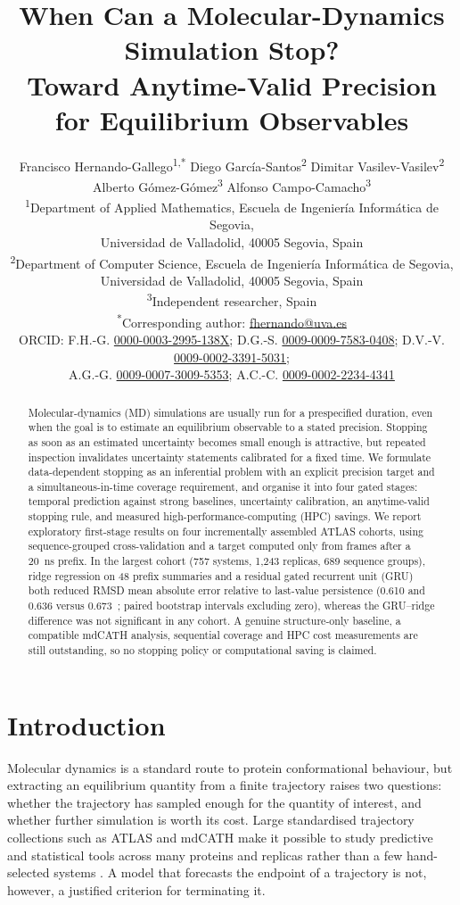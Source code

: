 \documentclass[11pt]{article}
\title{When Can a Molecular-Dynamics Simulation Stop?\\
\large Toward Anytime-Valid Precision for Equilibrium Observables}
\author{Francisco Hernando-Gallego\textsuperscript{1,*} \quad
Diego Garc\'ia-Santos\textsuperscript{2} \quad
Dimitar Vasilev-Vasilev\textsuperscript{2}\\
Alberto G\'omez-G\'omez\textsuperscript{3} \quad
Alfonso Campo-Camacho\textsuperscript{3}\\[1.2ex]
\small\textsuperscript{1}Department of Applied Mathematics, Escuela de Ingenier\'ia Inform\'atica de Segovia,\\
\small Universidad de Valladolid, 40005 Segovia, Spain\\
\small\textsuperscript{2}Department of Computer Science, Escuela de Ingenier\'ia Inform\'atica de Segovia,\\
\small Universidad de Valladolid, 40005 Segovia, Spain\\
\small\textsuperscript{3}Independent researcher, Spain\\[0.8ex]
\small\textsuperscript{*}Corresponding author: \href{mailto:fhernando@uva.es}{fhernando@uva.es}\\[0.4ex]
\footnotesize ORCID: F.H.-G. \href{https://orcid.org/0000-0003-2995-138X}{0000-0003-2995-138X}; D.G.-S. \href{https://orcid.org/0009-0009-7583-0408}{0009-0009-7583-0408}; D.V.-V. \href{https://orcid.org/0009-0002-3391-5031}{0009-0002-3391-5031};\\
A.G.-G. \href{https://orcid.org/0009-0007-3009-5353}{0009-0007-3009-5353}; A.C.-C. \href{https://orcid.org/0009-0002-2234-4341}{0009-0002-2234-4341}}
\date{}
\newcommand{\A}{\text{\AA}}
\begin{document}
\maketitle

\begin{abstract}
Molecular-dynamics (MD) simulations are usually run for a prespecified duration, even when the goal is to estimate an equilibrium observable to a stated precision. Stopping as soon as an estimated uncertainty becomes small enough is attractive, but repeated inspection invalidates uncertainty statements calibrated for a fixed time. We formulate data-dependent stopping as an inferential problem with an explicit precision target and a simultaneous-in-time coverage requirement, and organise it into four gated stages: temporal prediction against strong baselines, uncertainty calibration, an anytime-valid stopping rule, and measured high-performance-computing (HPC) savings. We report exploratory first-stage results on four incrementally assembled ATLAS cohorts, using sequence-grouped cross-validation and a target computed only from frames after a 20~ns prefix. In the largest cohort (757 systems, 1,243 replicas, 689 sequence groups), ridge regression on 48 prefix summaries and a residual gated recurrent unit (GRU) both reduced RMSD mean absolute error relative to last-value persistence (0.610 and 0.636 versus 0.673~\A; paired bootstrap intervals excluding zero), whereas the GRU--ridge difference was not significant in any cohort. A genuine structure-only baseline, a compatible mdCATH analysis, sequential coverage and HPC cost measurements are still outstanding, so no stopping policy or computational saving is claimed.
\end{abstract}

\section{Introduction}

Molecular dynamics is a standard route to protein conformational behaviour, but extracting an equilibrium quantity from a finite trajectory raises two questions: whether the trajectory has sampled enough for the quantity of interest, and whether further simulation is worth its cost. Large standardised trajectory collections such as ATLAS and mdCATH make it possible to study predictive and statistical tools across many proteins and replicas rather than a few hand-selected systems \cite{VanderMeersche2024ATLAS,Mirarchi2024mdCATH}. A model that forecasts the endpoint of a trajectory is not, however, a justified criterion for terminating it.
\end{document}
